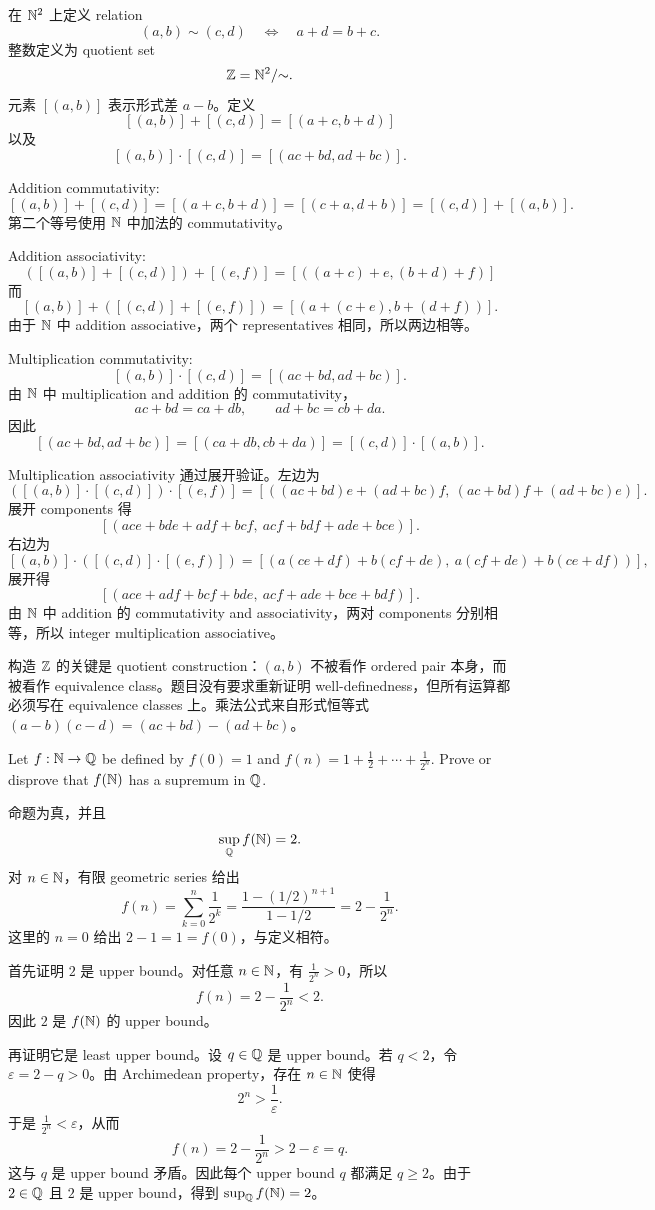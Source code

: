 \begin{solution}
在 \(\mathbb{N}^2\) 上定义 relation
\[
  (a,b)\sim(c,d)\quad\Longleftrightarrow\quad a+d=b+c.
\]
整数定义为 quotient set
\[
  \mathbb{Z}=\mathbb{N}^2/{\sim}.
\]
元素 \([(a,b)]\) 表示形式差 \(a-b\)。定义
\[
  [(a,b)]+[(c,d)]=[(a+c,b+d)]
\]
以及
\[
  [(a,b)]\cdot[(c,d)]=[(ac+bd,ad+bc)].
\]

Addition commutativity:
\[
[(a,b)]+[(c,d)]=[(a+c,b+d)]=[(c+a,d+b)]=[(c,d)]+[(a,b)].
\]
第二个等号使用 \(\mathbb{N}\) 中加法的 commutativity。

Addition associativity:
\[
([(a,b)]+[(c,d)])+[(e,f)]
=[((a+c)+e,(b+d)+f)]
\]
而
\[
[(a,b)]+([(c,d)]+[(e,f)])
=[(a+(c+e),b+(d+f))].
\]
由于 \(\mathbb{N}\) 中 addition associative，两个 representatives 相同，所以两边相等。

Multiplication commutativity:
\[
[(a,b)]\cdot[(c,d)]=[(ac+bd,ad+bc)].
\]
由 \(\mathbb{N}\) 中 multiplication and addition 的 commutativity，
\[
  ac+bd=ca+db,\qquad ad+bc=cb+da.
\]
因此
\[
[(ac+bd,ad+bc)]=[(ca+db,cb+da)]=[(c,d)]\cdot[(a,b)].
\]

Multiplication associativity 通过展开验证。左边为
\[
([(a,b)]\cdot[(c,d)])\cdot[(e,f)]
=[((ac+bd)e+(ad+bc)f,\ (ac+bd)f+(ad+bc)e)].
\]
展开 components 得
\[
[(ace+bde+adf+bcf,\ acf+bdf+ade+bce)].
\]
右边为
\[
[(a,b)]\cdot([(c,d)]\cdot[(e,f)])
=[(a(ce+df)+b(cf+de),\ a(cf+de)+b(ce+df))],
\]
展开得
\[
[(ace+adf+bcf+bde,\ acf+ade+bce+bdf)].
\]
由 \(\mathbb{N}\) 中 addition 的 commutativity and associativity，两对 components 分别相等，所以 integer multiplication associative。
\end{solution}

\begin{explanation}
构造 \(\mathbb{Z}\) 的关键是 quotient construction：\((a,b)\) 不被看作 ordered pair 本身，而被看作 equivalence class。题目没有要求重新证明 well-definedness，但所有运算都必须写在 equivalence classes 上。乘法公式来自形式恒等式 \((a-b)(c-d)=(ac+bd)-(ad+bc)\)。
\end{explanation}

\begin{exerciseblock}
Let \(f:\mathbb{N}\to\mathbb{Q}\) be defined by \(f(0)=1\) and \(f(n)=1+\frac12+\cdots+\frac1{2^n}\). Prove or disprove that \(f(\mathbb{N})\) has a supremum in \(\mathbb{Q}\).
\end{exerciseblock}

\begin{solution}
命题为真，并且
\[
  \sup_{\mathbb{Q}} f(\mathbb{N})=2.
\]
对 \(n\in\mathbb{N}\)，有限 geometric series 给出
\[
  f(n)=\sum_{k=0}^{n}\frac1{2^k}
  =\frac{1-(1/2)^{n+1}}{1-1/2}
  =2-\frac1{2^n}.
\]
这里的 \(n=0\) 给出 \(2-1=1=f(0)\)，与定义相符。

首先证明 \(2\) 是 upper bound。对任意 \(n\in\mathbb{N}\)，有 \(\frac1{2^n}>0\)，所以
\[
  f(n)=2-\frac1{2^n}<2.
\]
因此 \(2\) 是 \(f(\mathbb{N})\) 的 upper bound。

再证明它是 least upper bound。设 \(q\in\mathbb{Q}\) 是 upper bound。若 \(q<2\)，令 \(\varepsilon=2-q>0\)。由 Archimedean property，存在 \(n\in\mathbb{N}\) 使得
\[
  2^n>\frac1{\varepsilon}.
\]
于是 \(\frac1{2^n}<\varepsilon\)，从而
\[
  f(n)=2-\frac1{2^n}>2-\varepsilon=q.
\]
这与 \(q\) 是 upper bound 矛盾。因此每个 upper bound \(q\) 都满足 \(q\ge2\)。由于 \(2\in\mathbb{Q}\) 且 \(2\) 是 upper bound，得到 \(\sup_{\mathbb{Q}}f(\mathbb{N})=2\)。
\end{solution}

